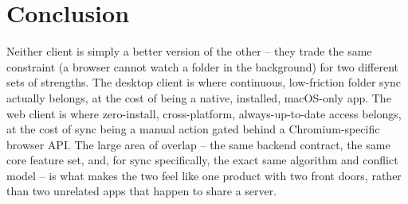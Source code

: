 \documentclass[12pt,a4paper]{article}
\begin{document}
\section{Conclusion}

Neither client is simply a better version of the other -- they trade the same constraint (a browser cannot watch a folder in the background) for two different sets of strengths. The desktop client is where continuous, low-friction folder sync actually belongs, at the cost of being a native, installed, macOS-only app. The web client is where zero-install, cross-platform, always-up-to-date access belongs, at the cost of sync being a manual action gated behind a Chromium-specific browser API. The large area of overlap -- the same backend contract, the same core feature set, and, for sync specifically, the exact same algorithm and conflict model -- is what makes the two feel like one product with two front doors, rather than two unrelated apps that happen to share a server.
\end{document}
